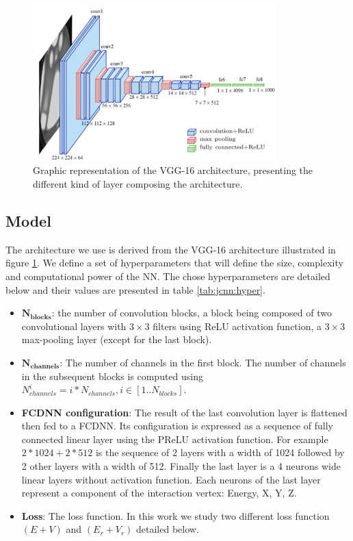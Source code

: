\documentclass[../main.tex]{subfiles}
\begin{document}
\begin{figure}[ht]
  \centering
  \includegraphics[height=6cm]{images/jcnn/vgg16.png}
  \caption{Graphic representation of the VGG-16 architecture, presenting the different kind of layer composing the architecture.}
  \label{fig:jcnn:vgg16}
\end{figure}

\subsection{Model}
\label{sec:jcnn:model}

The architecture we use is derived from the VGG-16 architecture \cite{simonyan_very_2015} illustrated in figure \ref{fig:jcnn:vgg16}. We define a set of hyperparameters that will define the size, complexity and computational power of the NN. The chose hyperparameters are detailed below and their values are presented in table \ref{tab:jcnn:hyper}.
\begin{itemize}
  \item $\mathbf{N_{blocks}}$: the number of convolution blocks, a block being composed of two convolutional layers with $3\times3$ filters using ReLU activation function, a $3\times3$ max-pooling layer (except for the last block).
  \item $\mathbf{N_{channels}}$: The number of channels in the first block. The number of channels in the subsequent blocks is computed using $N^i_{channels} = i * N_{channels}, i \in [1..N_{blocks}]$.
  \item \textbf{FCDNN configuration}: The result of the last convolution layer is flattened then fed to a FCDNN. Its configuration is expressed as a sequence of fully connected linear layer using the PReLU activation function. For example $2 * 1024 + 2 * 512$ is the sequence of 2 layers with a width of 1024 followed by 2 other layers with a width of 512. Finally the last layer is a 4 neurons wide linear layers without activation function. Each neurons of the last layer represent a component of the interaction vertex: Energy, X, Y, Z.
  \item \textbf{Loss}: The loss function. In this work we study two different loss function $(E+V)$ and $(E_r + V_r)$ detailed below.
\end{itemize}
\end{document}
